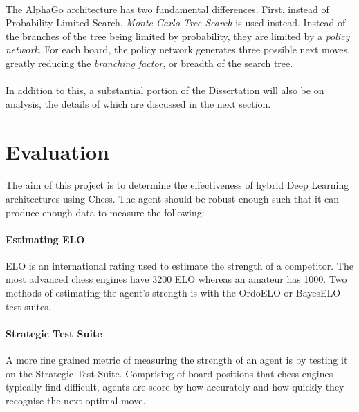 \documentclass[a4paper]{article}
\begin{document}
\paragraph{}The AlphaGo architecture has two fundamental differences. First, instead of Probability-Limited Search, \textit{Monte Carlo Tree Search} is used instead. Instead of the branches of the tree being limited by probability, they are limited by a \textit{policy network}. For each board, the policy network generates three possible next moves, greatly reducing the \textit{branching factor}, or breadth of the search tree. \cite{AlphaGo}

\paragraph{}In addition to this, a substantial portion of the Dissertation will also be on analysis, the details of which are discussed in the next section.


\section*{Evaluation}

\paragraph{}The aim of this project is to determine the effectiveness of hybrid Deep Learning architectures using Chess. The agent should be robust enough such that it can produce enough data to measure the following:

\paragraph{Estimating ELO} ELO is an international rating used to estimate the strength of a competitor. The most advanced chess engines have 3200 ELO whereas an amateur has 1000. \cite{giraffe} Two methods of estimating the agent's strength is with the OrdoELO or BayesELO test suites.

\paragraph{Strategic Test Suite} A more fine grained metric of measuring the strength of an agent is by testing it on the Strategic Test Suite. Comprising of board positions that chess engines typically find difficult, agents are score by how accurately and how quickly they recognise the next optimal move. \cite{sts}
\end{document}
